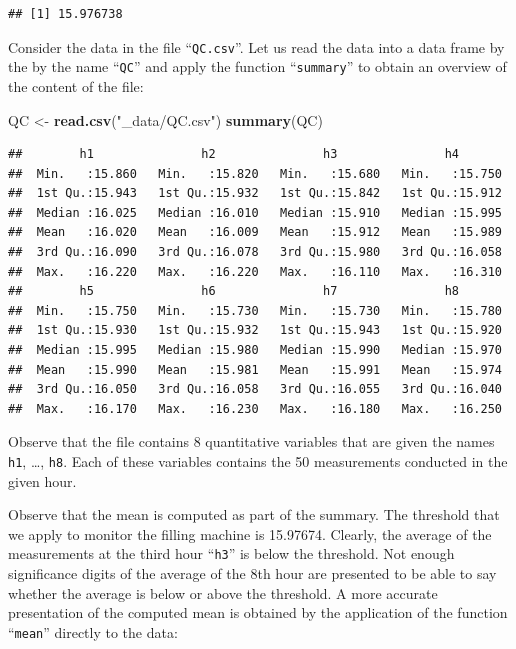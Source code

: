 \documentclass[]{krantz}
\makeatletter
\newenvironment{Shaded}{\begin{snugshade}}{\end{snugshade}}
\newcommand{\KeywordTok}[1]{\textcolor[rgb]{0.13,0.29,0.53}{\textbf{#1}}}
\newcommand{\NormalTok}[1]{#1}
\newcommand{\StringTok}[1]{\textcolor[rgb]{0.31,0.60,0.02}{#1}}
\newenvironment{kframe}{%
\medskip{}
\setlength{\fboxsep}{.8em}
 \def\at@end@of@kframe{}%
 \ifinner\ifhmode%
  \def\at@end@of@kframe{\end{minipage}}%
  \begin{minipage}{\columnwidth}%
 \fi\fi%
 \def\FrameCommand##1{\hskip\@totalleftmargin \hskip-\fboxsep
 \colorbox{shadecolor}{##1}\hskip-\fboxsep
     \hskip-\linewidth \hskip-\@totalleftmargin \hskip\columnwidth}%
 \MakeFramed {\advance\hsize-\width
   \@totalleftmargin\z@ \linewidth\hsize
   \@setminipage}}%
 {\par\unskip\endMakeFramed%
 \at@end@of@kframe}
\renewenvironment{Shaded}{\begin{kframe}}{\end{kframe}}
\theoremstyle{definition}
\theoremstyle{definition}
\theoremstyle{definition}
\theoremstyle{remark}
\makeatother
\begin{document}
\begin{verbatim}
## [1] 15.976738
\end{verbatim}

Consider the data in the file ``\texttt{QC.csv}''. Let us read the data into a
data frame by the by the name ``\texttt{QC}'' and apply the function ``\texttt{summary}''
to obtain an overview of the content of the file:

\begin{Shaded}
\begin{Highlighting}[]
\NormalTok{QC <-}\StringTok{ }\KeywordTok{read.csv}\NormalTok{(}\StringTok{"_data/QC.csv"}\NormalTok{)}
\KeywordTok{summary}\NormalTok{(QC)}
\end{Highlighting}
\end{Shaded}

\begin{verbatim}
##        h1               h2               h3               h4        
##  Min.   :15.860   Min.   :15.820   Min.   :15.680   Min.   :15.750  
##  1st Qu.:15.943   1st Qu.:15.932   1st Qu.:15.842   1st Qu.:15.912  
##  Median :16.025   Median :16.010   Median :15.910   Median :15.995  
##  Mean   :16.020   Mean   :16.009   Mean   :15.912   Mean   :15.989  
##  3rd Qu.:16.090   3rd Qu.:16.078   3rd Qu.:15.980   3rd Qu.:16.058  
##  Max.   :16.220   Max.   :16.220   Max.   :16.110   Max.   :16.310  
##        h5               h6               h7               h8        
##  Min.   :15.750   Min.   :15.730   Min.   :15.730   Min.   :15.780  
##  1st Qu.:15.930   1st Qu.:15.932   1st Qu.:15.943   1st Qu.:15.920  
##  Median :15.995   Median :15.980   Median :15.990   Median :15.970  
##  Mean   :15.990   Mean   :15.981   Mean   :15.991   Mean   :15.974  
##  3rd Qu.:16.050   3rd Qu.:16.058   3rd Qu.:16.055   3rd Qu.:16.040  
##  Max.   :16.170   Max.   :16.230   Max.   :16.180   Max.   :16.250
\end{verbatim}

Observe that the file contains 8 quantitative variables that are given
the names \texttt{h1}, \ldots{}, \texttt{h8}. Each of these variables contains the 50
measurements conducted in the given hour.

Observe that the mean is computed as part of the summary. The threshold
that we apply to monitor the filling machine is 15.97674. Clearly, the
average of the measurements at the third hour ``\texttt{h3}'' is below the
threshold. Not enough significance digits of the average of the 8th hour
are presented to be able to say whether the average is below or above
the threshold. A more accurate presentation of the computed mean is
obtained by the application of the function ``\texttt{mean}'' directly to the
data:
\end{document}
